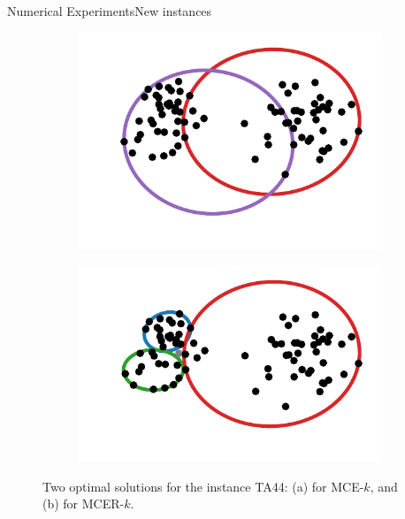 \documentclass{beamer}
\theoremstyle{definition}
\begin{document}
\begin{frame}{Numerical Experiments}{New instances}
	\begin{figure}
		\begin{subfigure}{.44\textwidth}
			\centering
			\includegraphics[scale=.6]{../article/figures/MCER_TA44}
			\caption{}
			\label{fig:MCER_TA44}
		\end{subfigure}
		\begin{subfigure}{.44\textwidth}
			\centering
			\includegraphics[scale=.6]{../article/figures/MCER_TA45}
			\caption{}
			\label{fig:MCER_TA45}
		\end{subfigure}
		\caption{Two optimal solutions for the instance TA44: (a) for MCE-$k$, and (b) for MCER-$k$.}
		\label{fig:TA44-45}
	\end{figure}
\end{frame}
\end{document}
